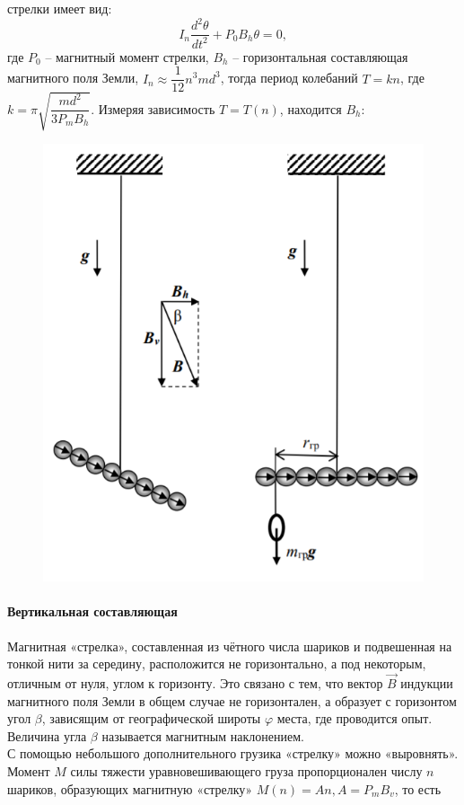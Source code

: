 \documentclass[a4paper,12pt]{article}
\begin{document}
стрелки имеет вид:
$$
I_n \dfrac{d^2 \theta}{dt^2} + P_0 B_h \theta = 0,
$$ 
где $P_0$ -- магнитный момент стрелки, $B_h$ -- горизонтальная составляющая магнитного поля Земли, $I_n \approx \dfrac{1}{12}n^3 m d^3$, тогда период колебаний $T = kn$, где $k = \pi \sqrt{\dfrac{md^2}{3P_m B_h}}$. Измеряя зависимость $T=T(n)$, находится $B_h$:
\begin{center}
\end{center}
\begin{figure}
\includegraphics[scale=0.5]{2.png}
\end{figure} 
\paragraph*{Вертикальная составляющая} 
Магнитная «стрелка», составленная из чётного числа
шариков и подвешенная на тонкой нити за середину, расположится не горизонтально, а под некоторым, отличным от нуля, углом к горизонту. Это связано с тем, что вектор $\vec{B}$ индукции магнитного поля Земли в общем случае не горизонтален, а образует с горизонтом
угол $\beta$, зависящим от географической широты $\varphi$
места, где проводится опыт. Величина угла $\beta$
называется магнитным наклонением.\\
С помощью небольшого дополнительного грузика «стрелку» можно «выровнять». Момент $M$ силы тяжести уравновешивающего груза пропорционален числу $n$ шариков, образующих магнитную «стрелку» $M(n) = An, A=P_m B_v$, то есть
\begin{center}
\end{center}
\end{document}
